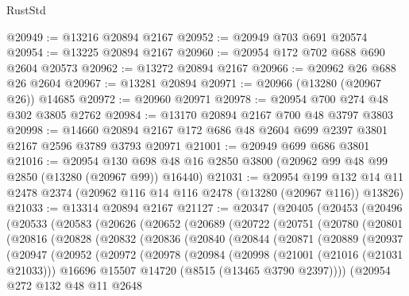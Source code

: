 \begin{lexlean}{RustStd}
\begin{coremodule}
@20949 := @13216 @20894 @2167
@20952 := @20949 @703 @691 @20574
@20954 := @13225 @20894 @2167
@20960 := @20954 @172 @702 @688 @690 @2604 @20573
@20962 := @13272 @20894 @2167
@20966 := @20962 @26 @688 @26 @2604
@20967 := @13281 @20894
@20971 := @20966 (@13280 (@20967 @26)) @14685
@20972 := @20960 @20971
@20978 := @20954 @700 @274 @48 @302 @3805 @2762
@20984 := @13170 @20894 @2167 @700 @48 @3797 @3803
@20998 := @14660 @20894 @2167 @172 @686 @48 @2604 @699 @2397 @3801 @2167 @2596 @3789 @3793 @20971
@21001 := @20949 @699 @686 @3801
@21016 := @20954
    @130
    @698
    @48
    @16
    @2850
    @3800
    (@20962 @99 @48 @99 @2850 (@13280 (@20967 @99)) @16440)
@21031 := @20954
    @199
    @132
    @14
    @11
    @2478
    @2374
    (@20962 @116 @14 @116 @2478 (@13280 (@20967 @116)) @13826)
@21033 := @13314 @20894 @2167
@21127 := @20347
    (@20405
      (@20453
        (@20496
          (@20533
            (@20583
              (@20626
                (@20652
                  (@20689
                    (@20722
                      (@20751
                        (@20780
                          (@20801
                            (@20816
                              (@20828
                                (@20832
                                  (@20836
                                    (@20840
                                      (@20844
                                        (@20871
                                          (@20889
                                            (@20937
                                              (@20947
                                                (@20952
                                                  (@20972
                                                    (@20978
                                                      (@20984
                                                        (@20998
                                                          (@21001 (@21016 (@21031 @21033)))
                                                          @16696
                                                          @15507
                                                          @14720
                                                          (@8515 (@13465 @3790 @2397))))
                                                      (@20954
                                                        @272
                                                        @132
                                                        @48
                                                        @11
                                                        @2648

\end{coremodule}
\end{lexlean}
